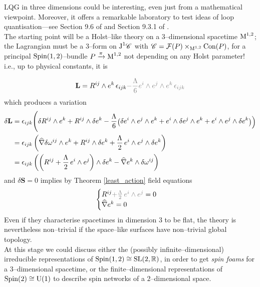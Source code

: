 
LQG in three dimensions could be interesting, even just from a mathematical viewpoint. Moreover, it offers a remarkable laboratory to test ideas of loop quantisation---see Section 9.6 of \cite{pullin2} and Section 9.3.1 of \cite{rov1}.\\

The starting point will be a Holst--like theory on a 3--dimensional spacetime $\text{\normalfont M}^{1,2}$; the Lagrangian must be a $3$--form on $\text{\normalfont J}^1\mathscr{C}$ with $\mathscr{C}=\mathcal{F}(P)\times_{\text{\normalfont M}^{1,2}}\text{\normalfont Con}(P)$, for a principal $\text{\normalfont Spin}(1,2)$--bundle $P\xrightarrow{\pi}\text{\normalfont M}^{1,2}$ not depending on any Holst parameter! i.e., up to physical constants, it is

$$\mathbf{L}=R^{ij}\wedge e^k\,\epsilon_{ijk}\textcolor{gray}{-\frac{\Lambda}{6}e^i\wedge e^j\wedge e^k\,\epsilon_{ijk}}$$
which produces a variation
\begin{align*}
    \delta\mathbf{L}&=\epsilon_{ijk}\Biggl(\delta R^{ij}\wedge e^k+R^{ij}\wedge\delta e^k-\tiny{\frac{\Lambda}{6}}\bigg(\delta e^i\wedge e^j\wedge e^k+e^i\wedge\delta e^j\wedge e^k+e^i\wedge e^j\wedge\delta e^k\bigg)\Biggl)\\
    &=\epsilon_{ijk}\left(\widehat{\nabla}\delta\omega^{ij}\wedge e^k+R^{ij}\wedge\delta e^k+\frac{\Lambda}{2}\, e^i\wedge e^j \wedge\delta e^k\right)\\
    &=\epsilon_{ijk}\left(\left(R^{ij}+\frac{\Lambda}{2}\,e^i\wedge e^j\right)\wedge\delta e^k-\widehat{\nabla} e^k\wedge\delta\omega^{ij}\right)
\end{align*}
and $\delta\mathbf{S}=0$ implies by Theorem \ref{least_action} field equations
\begin{equation}
    \begin{cases}
    R^{ij}\textcolor{gray}{+\frac{\Lambda}{2}\,e^i\wedge e^j}=0\\
    \nablaw e^k=0
    \end{cases}
\end{equation}
Even if they characterise spacetimes in dimension $3$ to be flat, the theory is nevertheless non--trivial if the space--like surfaces have non--trivial global topology.\\

At this stage we could discuss either the (possibly infinite--dimensional) irreducible representations of $\text{\normalfont Spin}(1,2)\cong\text{\normalfont SL}(2,\mathbb{R})$, in order to get \emph{spin foams} for a $3$--dimensional spacetime, or the finite--dimensional representations of $\text{\normalfont Spin}(2)\cong\text{\normalfont U}(1)$ to describe spin networks of a $2$--dimensional space.

